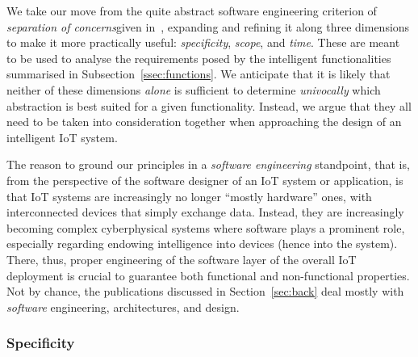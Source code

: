 %
We take our move from the quite abstract software engineering criterion of \emph{separation of concerns}given in~\cite{DBLP:conf/atal/MarianiPR22}, expanding and refining it along three dimensions to make it more practically useful: \emph{specificity}, \emph{scope}, and \emph{time}. 
%
These are meant to be used to analyse the requirements posed by the intelligent functionalities summarised in Subsection~\ref{ssec:functions}. 
%
We anticipate that it is likely that neither of these dimensions \emph{alone} is sufficient to determine \emph{univocally} which abstraction is best suited for a given functionality. 
Instead, we argue that they all need to be taken into consideration together when approaching the design of an intelligent IoT system.
%


The reason to ground our principles in a \emph{software engineering} standpoint, 
that is, from the perspective of the software designer of an IoT system or application, 
is that IoT systems are increasingly no longer ``mostly hardware'' ones, with interconnected devices that simply exchange data. 
Instead, they are increasingly becoming complex cyberphysical systems
where software plays a prominent role, 
especially regarding endowing intelligence into devices (hence into the system).
There, thus, proper engineering of the software layer of the overall IoT deployment 
is crucial to guarantee both functional and non-functional properties. 
Not by chance, the publications discussed in Section~\ref{sec:back} deal mostly with \emph{software} engineering, architectures, and design. 


\subsubsection{Specificity} 


